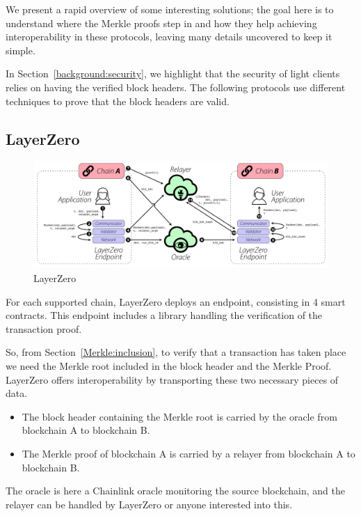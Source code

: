 We present a rapid overview of some interesting solutions; the goal here is to understand where the Merkle proofs step in and how they help achieving interoperability in these protocols, leaving many details uncovered to keep it simple.

In Section~\ref{background:security}, we highlight that the security of  light clients relies on having the verified block headers. The following protocols use different techniques to prove that the block headers are valid. 

\subsection{LayerZero \cite{zarick2021layerzero}}
\begin{figure}[H]
    \centering
\includegraphics[width=1.\linewidth]{interoperability/layerZero.png}
    \caption{LayerZero \cite{zarick2021layerzero}}
    \label{fig:layer_zero}
\end{figure}

For each supported chain, LayerZero deploys an endpoint, consisting in 4 smart contracts. This endpoint includes a library handling the verification of the transaction proof.

So, from Section~\ref{Merkle:inclusion},  to verify that a transaction has taken place we need the Merkle root included in the block header and the Merkle Proof. LayerZero offers interoperability by transporting these two necessary pieces of data.
\begin{itemize}
    \item The block header containing the Merkle root is carried by the oracle from blockchain A to blockchain B. 
    \item The Merkle proof of blockchain A is carried by a relayer from blockchain A to blockchain B.
\end{itemize}

The oracle is here a Chainlink oracle monitoring the source blockchain, and the relayer can be handled by LayerZero or anyone interested into this. 

